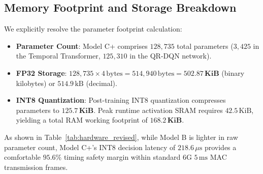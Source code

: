 \documentclass[conference]{IEEEtran}
\begin{document}
\subsection{Memory Footprint and Storage Breakdown}
We explicitly resolve the parameter footprint calculation:
\begin{itemize}
    \item \textbf{Parameter Count}: Model C+ comprises $128,735$ total parameters ($3,425$ in the Temporal Transformer, $125,310$ in the QR-DQN network).
    \item \textbf{FP32 Storage}: $128,735 \times 4\,\text{bytes} = 514,940\,\text{bytes} = \mathbf{502.87\,\text{KiB}}$ (binary kilobytes) or $514.9\,\text{kB}$ (decimal).
    \item \textbf{INT8 Quantization}: Post-training INT8 quantization compresses parameters to $\mathbf{125.7\,\text{KiB}}$. Peak runtime activation SRAM requires $42.5\,\text{KiB}$, yielding a total RAM working footprint of $\mathbf{168.2\,\text{KiB}}$.
\end{itemize}

\begin{table}[htbp]
\caption{Comparative Hardware Metrics across Routing Architectures}
\label{tab:hardware_revised}
\centering
{}
\end{table}

As shown in Table~\ref{tab:hardware_revised}, while Model B is lighter in raw parameter count, Model C+'s INT8 decision latency of $218.6\,\mu\text{s}$ provides a comfortable $95.6\%$ timing safety margin within standard 6G $5\,\text{ms}$ MAC transmission frames.
\end{document}

